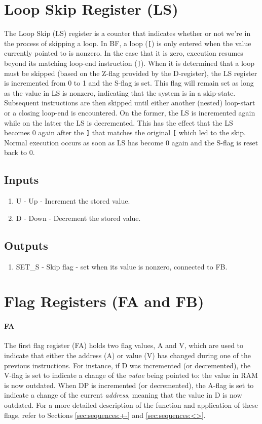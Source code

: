 \section{Loop Skip Register (LS)} \label{sec:architecture:ls}
The Loop Skip (LS) register is a counter that indicates whether or not we're in the process of skipping a loop. In BF, a loop (\texttt{[}) is only entered when the value currently pointed to is nonzero. In the case that it is zero, execution resumes beyond its matching loop-end instruction (\texttt{]}). When it is determined that a loop must be skipped (based on the Z-flag provided by the D-register), the LS register is incremented from 0 to 1 and the S-flag is set. This flag will remain set as long as the value in LS is nonzero, indicating that the system is in a skip-state. Subsequent instructions are then skipped until either another (nested) loop-start or a closing loop-end is encountered. On the former, the LS is incremented again while on the latter the LS is decremented. This has the effect that the LS becomes 0 again after the \texttt{]} that matches the original \texttt{[} which led to the skip. Normal execution occurs as soon as LS has become 0 again and the S-flag is reset back to 0.

\subsection*{Inputs}
\begin{enumerate}
  \itemsep0em
\item U - Up - Increment the stored value.
\item D - Down - Decrement the stored value.
\end{enumerate}

\subsection*{Outputs}
\begin{enumerate}
\itemsep0em 
\item SET\_S - Skip flag - set when its value is nonzero, connected to FB.
\end{enumerate}

\section{Flag Registers (FA and FB)} \label{sec:architecture:flag-registers}
\paragraph{FA} The first flag register (FA) holds two flag values, A and V, which are used to indicate that either the address (A) or value (V) has changed during one of the previous instructions. For instance, if D was incremented (or decremented), the V-flag is set to indicate a change of the \emph{value} being pointed to: the value in RAM is now outdated. When DP is incremented (or decremented), the A-flag is set to indicate a change of the current \emph{address}, meaning that the value in D is now outdated. For a more detailed description of the function and application of these flags, refer to Sections \ref{sec:sequences:+-} and \ref{sec:sequences:<>}.

